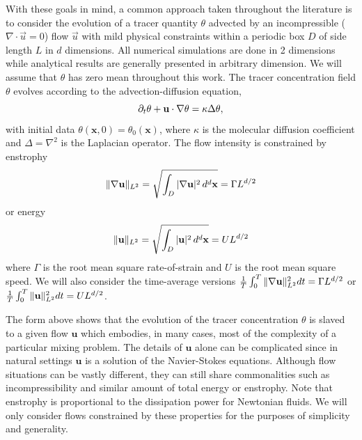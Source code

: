 With these goals in mind, a common approach taken throughout the literature is to consider the evolution of a tracer quantity $\theta$ advected by an incompressible ($\nabla \cdot\vec{u}=0$) flow $\vec{u}$ with mild physical constraints within a periodic box $D$ of side length $L$ in $d$ dimensions. All numerical simulations are done in 2 dimensions while analytical results are generally presented in arbitrary dimension. We will assume that $\theta$  has zero mean throughout this work. The tracer concentration field $\theta$ evolves according to the advection-diffusion equation,
\begin{equation}
	\label{eq:PDE_advection}
	\partial_{t} \theta+\mathbf{u}\cdot \nabla \theta=\kappa \Delta\theta,
\end{equation}
with initial data $\theta(\mathbf{x},0)=\theta_{0}(\mathbf{x})$, where $\kappa$ is the molecular diffusion coefficient and $\Delta = \nabla^2$ is the Laplacian operator. The flow intensity is constrained by enstrophy \begin{equation}
\|\nabla\mathbf{u}\|_{L^{2}} = \sqrt{ \int_{D} |\nabla \mathbf{u}|^2 \, d^{d}\mathbf{x} } =\Gamma L^{d/2}
\end{equation} or energy
\begin{equation} 
\|\mathbf{u}\|_{L^{2}} = \sqrt{ \int_{D} | \mathbf{u}|^2 \, d^{d}\mathbf{x} } = UL^{d/2}
\end{equation}
 where $\Gamma$ is the root mean square rate-of-strain and $U$ is the root mean square speed. We will also consider the time-average versions $\frac{1}{T}\int_0^T\|\nabla\mathbf{u}\|_{L^{2}}^2 dt = \Gamma L^{d/2}$ or $\frac{1}{T}\int_0^T\|\mathbf{u}\|_{L^{2}}^2 dt = U L^{d/2}$.


 The form above shows that the evolution of the tracer concentration $\theta$ is slaved to a given flow $\mathbf{u}$ which embodies, in many cases, most of the complexity of a particular mixing problem. The details of $\mathbf{u}$ alone can be complicated since in natural settings $\mathbf{u}$ is a solution of the Navier-Stokes equations. Although flow situations can be vastly different, they can still share commonalities such as incompressibility and similar amount of total energy or enstrophy. Note that enstrophy is proportional to the dissipation power for Newtonian fluids. We will only consider flows constrained by these properties for the purposes of simplicity and generality.


